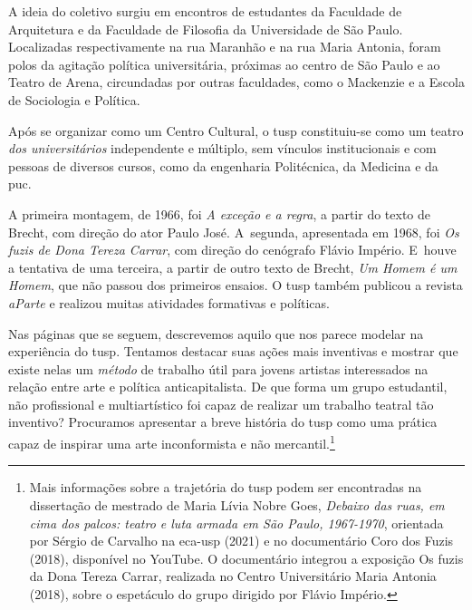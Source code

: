 A ideia do coletivo surgiu em encontros de estudantes da
Faculdade de Arquitetura e da Faculdade de Filosofia da
Universidade de São Paulo. Localizadas respectivamente na rua Maranhão e
na rua Maria Antonia, foram polos da agitação política universitária,
próximas ao centro de São Paulo e ao Teatro de Arena, circundadas por
outras faculdades, como o Mackenzie e a Escola de Sociologia e Política.

Após se organizar como um Centro Cultural, o {\sc tusp} constituiu-se como um
teatro {\it dos universitários} independente e múltiplo, sem vínculos
institucionais e com pessoas de diversos cursos, como da engenharia
Politécnica, da Medicina e da {\sc puc}.


A primeira montagem, de 1966, foi {\it A exceção e a regra}, a partir do
texto de Brecht, com direção do ator Paulo José. A~segunda, apresentada
em 1968, foi {\it Os fuzis de Dona Tereza Carrar}, com direção do
cenógrafo Flávio Império. E~houve a tentativa de uma terceira, a partir
de outro texto de Brecht, {\it Um Homem é um Homem}, que não passou dos
primeiros ensaios. O {\sc tusp} também publicou a revista {\it aParte} e realizou
muitas atividades formativas e políticas.

Nas páginas que se seguem, descrevemos aquilo que nos parece modelar na
experiência do {\sc tusp}. Tentamos destacar suas ações mais inventivas e
mostrar que existe nelas um {\it método} de trabalho útil para jovens
artistas interessados na relação entre arte e política anticapitalista.
De que forma um grupo estudantil, não profissional e multiartístico foi
capaz de realizar um trabalho teatral tão inventivo? Procuramos
apresentar a breve história do {\sc tusp} como uma prática capaz de inspirar
uma arte inconformista e não mercantil.\footnote{Mais informações sobre a trajetória do {\sc tusp} podem ser encontradas na dissertação de mestrado de Maria Lívia Nobre Goes, {\it Debaixo das ruas, em cima dos palcos: teatro e luta armada em São Paulo, 1967-1970}, orientada por Sérgio de Carvalho na {\sc eca-usp} (2021) e no documentário Coro dos Fuzis (2018), disponível no YouTube. O documentário integrou a exposição Os fuzis da Dona Tereza Carrar, realizada no Centro Universitário Maria Antonia (2018), sobre o espetáculo do grupo dirigido por Flávio Império.}

